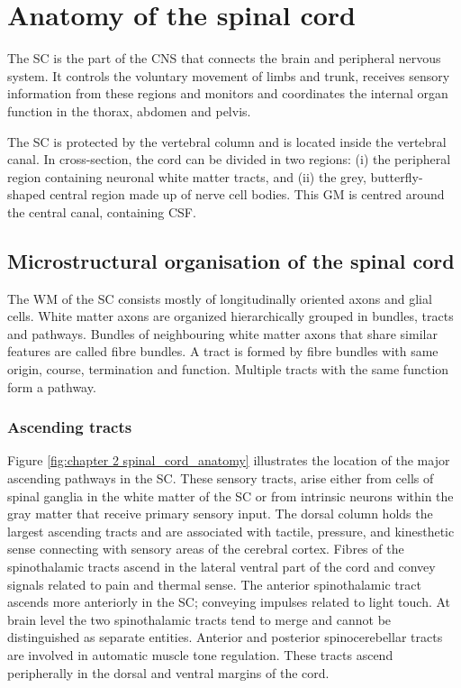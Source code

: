 \newcommand{\prot}{\ensuremath{\mathcal{P}}}
\label{chapter2}
\section{Anatomy of the spinal cord}
\glsresetall
The {\gls{SC}} is the part of the {\gls{CNS}} that connects the brain and peripheral nervous system. It controls the voluntary movement of limbs and trunk, receives sensory information from these regions and monitors and coordinates the internal organ function in the thorax, abdomen and pelvis. 

The {\gls{SC}} is protected by the vertebral column and is located inside the vertebral canal. In cross-section, the cord can be divided in two regions: (i) the peripheral region containing neuronal white matter tracts, and (ii) the grey, butterfly-shaped central region made up of nerve cell bodies. This \gls{GM} is centred around the central canal, containing \gls{CSF}.

\subsection{Microstructural organisation of the spinal cord}
The \gls{WM} of the {\gls{SC}} consists mostly of longitudinally oriented axons and glial cells. White matter axons are organized hierarchically grouped in bundles, tracts and pathways. Bundles of neighbouring white matter axons that share similar features are called fibre bundles. A tract is formed by fibre bundles with same origin, course, termination and function. Multiple tracts with the same function form a pathway.

\subsubsection{Ascending tracts}
\label{sec:chap2:ascendingtracts}
Figure \ref{fig:chapter 2 spinal_cord_anatomy} illustrates the location of the major ascending pathways in the {\gls{SC}}. These sensory tracts, arise either from cells of spinal ganglia in the white matter of the {\gls{SC}} or from intrinsic neurons within the gray matter that receive primary sensory input. The dorsal column holds the largest ascending tracts and are associated with tactile, pressure, and kinesthetic sense connecting with sensory areas of the cerebral cortex. Fibres of the spinothalamic tracts ascend in the lateral ventral part of the cord and convey signals related to pain and thermal sense. The anterior spinothalamic tract ascends more anteriorly in the {\gls{SC}}; conveying impulses related to light touch. At brain level the two spinothalamic tracts tend to merge and cannot be distinguished as separate entities. Anterior and posterior spinocerebellar tracts are involved in automatic muscle tone regulation. These tracts ascend peripherally in the dorsal and ventral margins of the cord.

